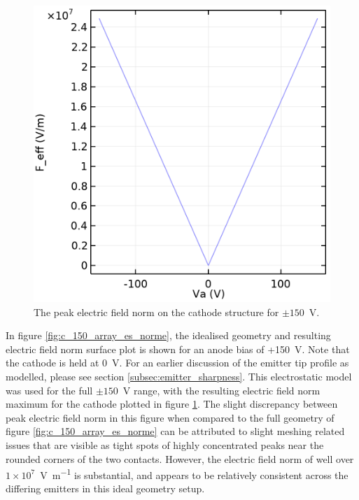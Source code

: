 \begin{refsection}
\begin{figure}
    \centering
    \includegraphics[width=\linewidth]{Chapter7/Figs/Raster/Comsol/array_es_full.png}
    \caption{The peak electric field norm on the cathode structure for $\pm150$~\si{\volt}.}
    \label{fig:c_array_es_full}
\end{figure}

In figure \ref{fig:c_150_array_es_norme}, the idealised geometry and resulting electric field norm surface plot is shown for an anode bias of +150~\si{\volt}. Note that the cathode is held at 0~\si{\volt}. For an earlier discussion of the emitter tip profile as modelled, please see section \ref{subsec:emitter_sharpness}. This electrostatic model was used for the full $\pm150$~\si{\volt} range, with the resulting electric field norm maximum for the cathode plotted in figure \ref{fig:c_array_es_full}. The slight discrepancy between peak electric field norm in this figure when compared to the full geometry of figure \ref{fig:c_150_array_es_norme} can be attributed to slight meshing related issues that are visible as tight spots of highly concentrated peaks near the rounded corners of the two contacts. However, the electric field norm of well over $1\times10^{7}$~\si{\volt\per\metre} is substantial, and appears to be relatively consistent across the differing emitters in this ideal geometry setup.


\end{refsection}
